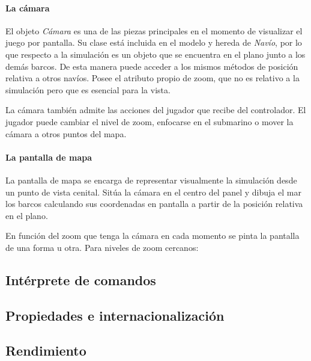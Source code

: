 \documentclass[a4paper,
	11pt,
	parskip=full,
	bibliography=totoc,
	twoside
	]{scrartcl}
\begin{document}
		\paragraph{La cámara}
			El objeto \textit{Cámara} es una de las piezas principales en el momento de visualizar el juego por pantalla. Su clase está incluida en el modelo y hereda de \textit{Navío}, por lo que respecto a la simulación es un objeto que se encuentra en el plano junto a los demás barcos. De esta manera puede acceder a los mismos métodos de posición relativa a otros navíos. Posee el atributo propio de zoom, que no es relativo a la simulación pero que es esencial para la vista.
			
			La cámara también admite las acciones del jugador que recibe del controlador. El jugador puede cambiar el nivel de zoom, enfocarse en el submarino o mover la cámara a otros puntos del mapa.
			
		\paragraph{La pantalla de mapa}
			La pantalla de mapa se encarga de representar visualmente la simulación desde un punto de vista cenital. Sitúa la cámara en el centro del panel y dibuja el mar los barcos calculando sus coordenadas en pantalla a partir de la posición relativa en el plano.
			
			En función del zoom que tenga la cámara en cada momento se pinta la pantalla de una forma u otra. Para niveles de zoom cercanos:
			
%				
	
	\subsection{Intérprete de comandos}
	\label{subsec:interprete_comandos}
	
	\subsection{Propiedades e internacionalización}
	\label{subsec:propiedades_internacionalizacion}
	
	\subsection{Rendimiento}
	\label{subsec:rendimiento}
	
\end{document}
